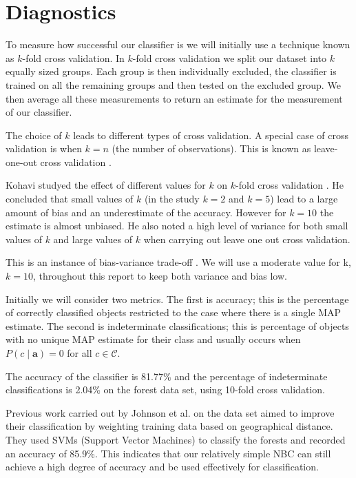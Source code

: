 \section{Diagnostics}

To measure how successful our classifier is we will initially use a technique known as $k$-fold cross validation.
In $k$-fold cross validation we split our dataset into $k$ equally sized groups.
Each group is then individually excluded, the classifier is trained on all the remaining groups and then tested on the excluded group.
We then average all these measurements to return an estimate for the measurement of our classifier.

The choice of $k$ leads to different types of cross validation.
A special case of cross validation is when $k=n$ (the number of observations).
This is known as leave-one-out cross validation \cite{Priddy05}.

Kohavi studyed the effect of different values for $k$ on $k$-fold cross validation \cite{Kohavi95}.
He concluded that small values of $k$ (in the study $k=2$ and $k=5$) lead to a large amount of bias and an underestimate of the accuracy.
However for $k=10$ the estimate is almost unbiased.
He also noted a high level of variance for both small values of $k$ and large values of $k$ when carrying out leave one out cross validation.

This is an instance of bias-variance trade-off \cite{James13}.
We will use a moderate value for k, $k=10$, throughout this report to keep both variance and bias low.

Initially we will consider two metrics.
The first is accuracy; this is the percentage of correctly classified objects restricted to the case where there is a single MAP estimate.
The second is indeterminate classifications; this is percentage of objects with no unique MAP estimate for their class and usually occurs when $P(c \mid \mathbf{a}) = 0$ for all $c \in \mathcal{C}$.

The accuracy of the classifier is 81.77\% and the percentage of indeterminate classifications is 2.04\% on the forest data set, using 10-fold cross validation.

Previous work carried out by Johnson et al. \cite{Johnson12} on the data set aimed to improve their classification by weighting training data based on geographical distance.
They used SVMs (Support Vector Machines) to classify the forests and recorded an accuracy of 85.9\%.
This indicates that our relatively simple NBC can still achieve a high degree of accuracy and be used effectively for classification.

